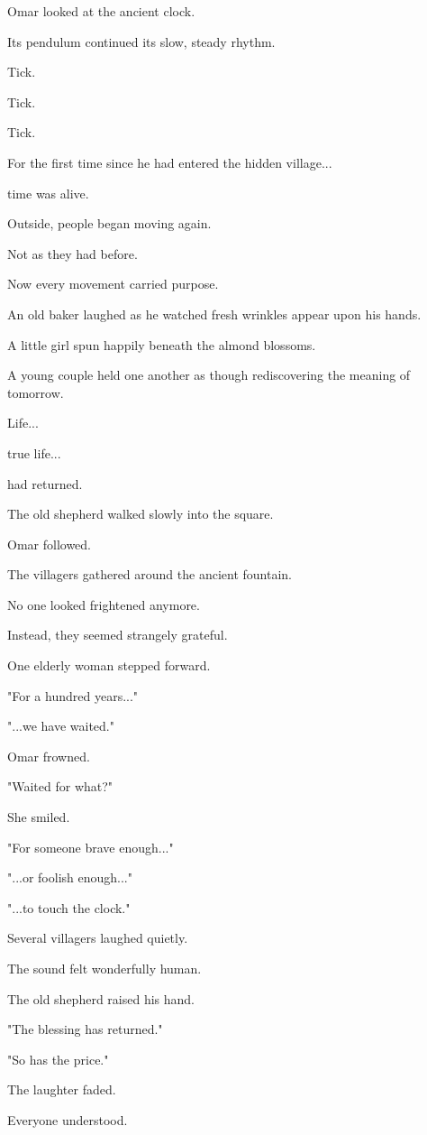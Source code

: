 \documentclass[12pt,openany]{book}
\begin{document}
Omar looked at the ancient clock.

Its pendulum continued its slow, steady rhythm.

Tick.

Tick.

Tick.

For the first time since he had entered the hidden village...

time was alive.

Outside, people began moving again.

Not as they had before.

Now every movement carried purpose.

An old baker laughed as he watched fresh wrinkles appear upon his hands.

A little girl spun happily beneath the almond blossoms.

A young couple held one another as though rediscovering the meaning of tomorrow.

Life...

true life...

had returned.

The old shepherd walked slowly into the square.

Omar followed.

The villagers gathered around the ancient fountain.

No one looked frightened anymore.

Instead, they seemed strangely grateful.

One elderly woman stepped forward.

"For a hundred years..."

"...we have waited."

Omar frowned.

"Waited for what?"

She smiled.

"For someone brave enough..."

"...or foolish enough..."

"...to touch the clock."

Several villagers laughed quietly.

The sound felt wonderfully human.

The old shepherd raised his hand.

"The blessing has returned."

"So has the price."

The laughter faded.

Everyone understood.
\end{document}
